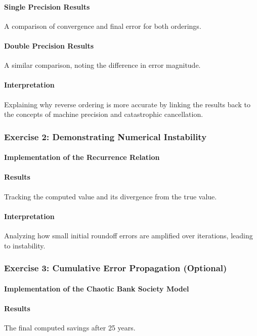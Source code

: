 \paragraph{Single Precision Results} A comparison of convergence and final error for both orderings.

\paragraph{Double Precision Results} A similar comparison, noting the difference in error magnitude.
\paragraph{Interpretation} Explaining why reverse ordering is more accurate by linking the results back to the concepts of machine precision and catastrophic cancellation.

\subsubsection{Exercise 2: Demonstrating Numerical Instability}
\paragraph{Implementation of the Recurrence Relation} 
\paragraph{Results} Tracking the computed value and its divergence from the true value.
\paragraph{Interpretation} Analyzing how small initial roundoff errors are amplified over iterations, leading to instability.

\subsubsection{Exercise 3: Cumulative Error Propagation (Optional)}
\paragraph{Implementation of the Chaotic Bank Society Model} 
\paragraph{Results} The final computed savings after 25 years.

